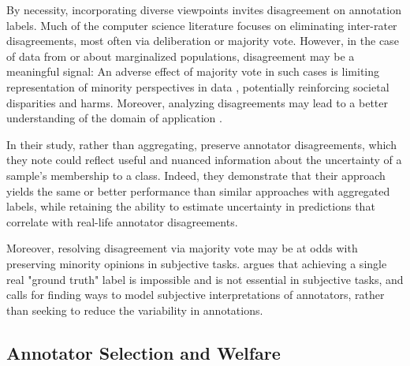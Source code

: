 \documentclass[letterpaper]{article} %
\begin{document}


By necessity, incorporating diverse viewpoints invites disagreement on annotation labels. Much of the computer science literature focuses on eliminating inter-rater disagreements, most often via deliberation or majority vote. However, in the case of data from or about marginalized populations, disagreement may be a meaningful signal: An adverse effect of majority vote in such cases is limiting representation of minority perspectives in data \citet{prabhakaran2021}, potentially reinforcing societal disparities and harms. Moreover, analyzing disagreements may lead to a better understanding of the domain of application \citet{patton2019}. 


In their study, rather than aggregating, \citet{Davani2021} preserve annotator disagreements, which they note could reflect useful and nuanced information about the uncertainty of a sample's membership to a class. Indeed, they demonstrate that their approach yields the same or better performance than similar approaches with aggregated labels, while retaining the ability to estimate uncertainty in predictions that correlate with real-life annotator disagreements.

Moreover, resolving disagreement via majority vote may be at odds with preserving minority opinions in subjective tasks. \citet{ovesdotter-alm-2011-subjective} argues that achieving a single real "ground truth" label is impossible and is not essential in subjective tasks, and calls for finding ways to model subjective interpretations of annotators, rather than seeking to reduce the variability in annotations.


\subsection{Annotator Selection and Welfare}
\end{document}
